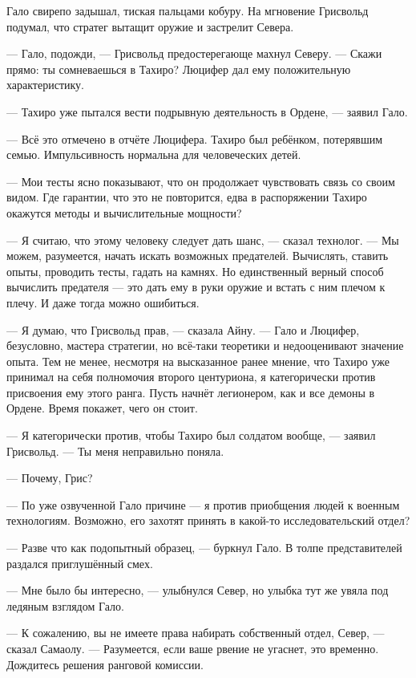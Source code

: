 Гало свирепо задышал, тиская пальцами кобуру.
На мгновение Грисвольд подумал, что стратег вытащит оружие и застрелит Севера.

--- Гало, подожди, --- Грисвольд предостерегающе махнул Северу.
--- Скажи прямо: ты сомневаешься в Тахиро?
Люцифер дал ему положительную характеристику.

--- Тахиро уже пытался вести подрывную деятельность в Ордене, --- заявил Гало.

--- Всё это отмечено в отчёте Люцифера.
Тахиро был ребёнком, потерявшим семью.
Импульсивность нормальна для человеческих детей.

--- Мои тесты ясно показывают, что он продолжает чувствовать связь со своим видом.
Где гарантии, что это не повторится, едва в распоряжении Тахиро окажутся методы и вычислительные мощности?

--- Я считаю, что этому человеку следует дать шанс, --- сказал технолог.
--- Мы можем, разумеется, начать искать возможных предателей.
Вычислять, ставить опыты, проводить тесты, гадать на камнях.
Но единственный верный способ вычислить предателя --- это дать ему в руки оружие и встать с ним плечом к плечу.
И даже тогда можно ошибиться.

--- Я думаю, что Грисвольд прав, --- сказала Айну.
--- Гало и Люцифер, безусловно, мастера стратегии, но всё-таки теоретики и недооценивают значение опыта.
Тем не менее, несмотря на высказанное ранее мнение, что Тахиро уже принимал на себя полномочия второго центуриона, я категорически против присвоения ему этого ранга.
Пусть начнёт легионером, как и все демоны в Ордене.
Время покажет, чего он стоит.

--- Я категорически против, чтобы Тахиро был солдатом вообще, --- заявил Грисвольд.
--- Ты меня неправильно поняла.

--- Почему, Грис?

--- По уже озвученной Гало причине --- я против приобщения людей к военным технологиям.
Возможно, его захотят принять в какой-то исследовательский отдел?

--- Разве что как подопытный образец, --- буркнул Гало.
В толпе представителей раздался приглушённый смех.

--- Мне было бы интересно, --- улыбнулся Север, но улыбка тут же увяла под ледяным взглядом Гало.

--- К сожалению, вы не имеете права набирать собственный отдел, Север, --- сказал Самаолу.
--- Разумеется, если ваше рвение не угаснет, это временно.
Дождитесь решения ранговой комиссии.

